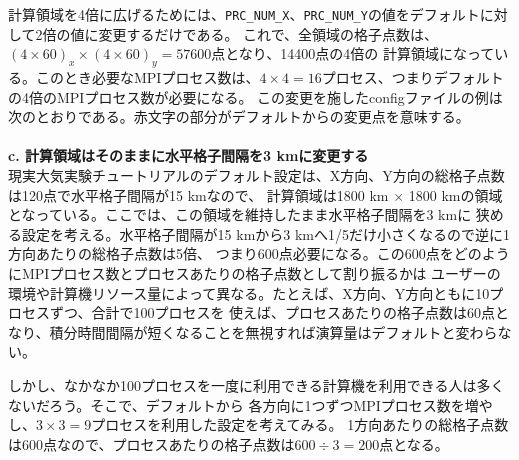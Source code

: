 計算領域を4倍に広げるためには、\verb|PRC_NUM_X|、\verb|PRC_NUM_Y|の値をデフォルトに対して2倍の値に変更するだけである。
これで、全領域の格子点数は、$(4 \times 60)_{x} \times (4 \times 60)_{y} = 57600$点となり、14400点の4倍の
計算領域になっている。このとき必要なMPIプロセス数は、$4 \times 4 = 16$プロセス、つまりデフォルトの4倍のMPIプロセス数が必要になる。
この変更を施したconfigファイルの例は次のとおりである。赤文字の部分がデフォルトからの変更点を意味する。\\

\\

\vspace{5mm}
{\bf c. 計算領域はそのままに水平格子間隔を3 kmに変更する}\\

現実大気実験チュートリアルのデフォルト設定は、X方向、Y方向の総格子点数は120点で水平格子間隔が15 kmなので、
計算領域は1800 km $\times$ 1800 kmの領域となっている。ここでは、この領域を維持したまま水平格子間隔を3 kmに
狭める設定を考える。水平格子間隔が15 kmから3 kmへ1/5だけ小さくなるので逆に1方向あたりの総格子点数は5倍、
つまり600点必要になる。この600点をどのようにMPIプロセス数とプロセスあたりの格子点数として割り振るかは
ユーザーの環境や計算機リソース量によって異なる。たとえば、X方向、Y方向ともに10プロセスずつ、合計で100プロセスを
使えば、プロセスあたりの格子点数は60点となり、積分時間間隔が短くなることを無視すれば演算量はデフォルトと変わらない。

しかし、なかなか100プロセスを一度に利用できる計算機を利用できる人は多くないだろう。そこで、デフォルトから
各方向に1つずつMPIプロセス数を増やし、$3 \times 3 = 9$プロセスを利用した設定を考えてみる。
1方向あたりの総格子点数は600点なので、プロセスあたりの格子点数は$600 \div 3 = 200$点となる。

